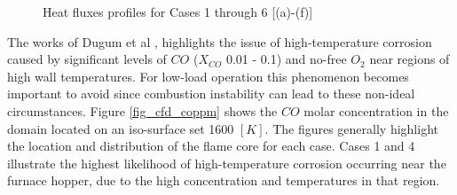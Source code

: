 \documentclass[twocolumn,10pt]{asme2ej}
\begin{document}
\begin{figure}[h!]
\hspace{10mm}
\hspace{10mm}
\caption{Heat fluxes profiles for Cases 1 through 6 [(a)-(f)]}
\label{fig_cfd_heat_flux}
\end{figure}
\newpage
The works of Dugum et al \cite{ugum2019}, highlights the issue of high-temperature corrosion caused by significant levels of $CO$ ($X_{CO}$ 0.01 - 0.1) and no-free $O_2$ near regions of high wall temperatures. For low-load operation this phenomenon becomes important to avoid since combustion instability can lead to these non-ideal circumstances. Figure \ref{fig_cfd_coppm} shows the $CO$ molar concentration in the domain located on an iso-surface set 1600 $[K]$. The figures generally highlight the location and distribution of the flame core for each case. Cases 1 and 4 illustrate the highest likelihood of high-temperature corrosion occurring near the furnace hopper, due to the high concentration and temperatures in that region.
\end{document}
